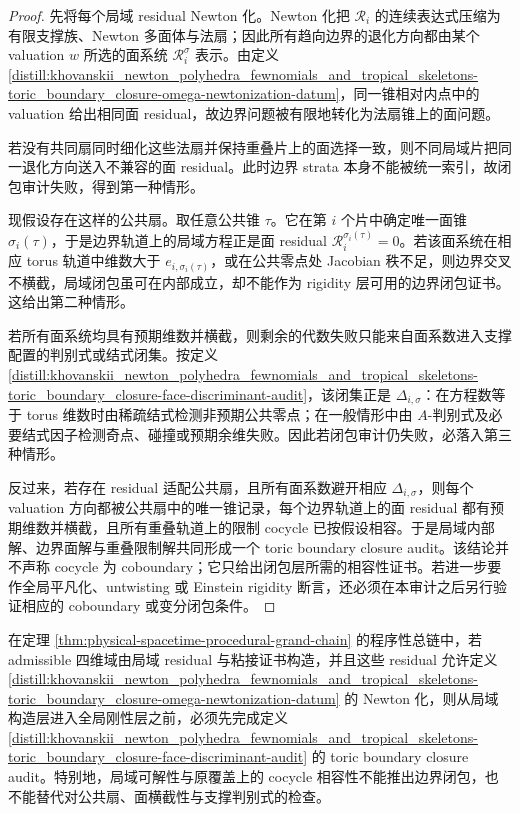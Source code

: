 \begin{proof}
先将每个局域 residual Newton 化。Newton 化把 \(\mathcal R_i\) 的连续表达式压缩为有限支撑族、Newton 多面体与法扇；因此所有趋向边界的退化方向都由某个 valuation \(w\) 所选的面系统 \(\mathcal R_i^{\sigma}\) 表示。由定义 \ref{distill:khovanskii_newton_polyhedra_fewnomials_and_tropical_skeletons-toric_boundary_closure-omega-newtonization-datum}，同一锥相对内点中的 valuation 给出相同面 residual，故边界问题被有限地转化为法扇锥上的面问题。

若没有共同扇同时细化这些法扇并保持重叠片上的面选择一致，则不同局域片把同一退化方向送入不兼容的面 residual。此时边界 strata 本身不能被统一索引，故闭包审计失败，得到第一种情形。

现假设存在这样的公共扇。取任意公共锥 \(\tau\)。它在第 \(i\) 个片中确定唯一面锥 \(\sigma_i(\tau)\)，于是边界轨道上的局域方程正是面 residual \(\mathcal R_i^{\sigma_i(\tau)}=0\)。若该面系统在相应 torus 轨道中维数大于 \(e_{i,\sigma_i(\tau)}\)，或在公共零点处 Jacobian 秩不足，则边界交叉不横截，局域闭包虽可在内部成立，却不能作为 rigidity 层可用的边界闭包证书。这给出第二种情形。

若所有面系统均具有预期维数并横截，则剩余的代数失败只能来自面系数进入支撑配置的判别式或结式闭集。按定义 \ref{distill:khovanskii_newton_polyhedra_fewnomials_and_tropical_skeletons-toric_boundary_closure-face-discriminant-audit}，该闭集正是 \(\Delta_{i,\sigma}\)：在方程数等于 torus 维数时由稀疏结式检测非预期公共零点；在一般情形中由 \(A\)-判别式及必要结式因子检测奇点、碰撞或预期余维失败。因此若闭包审计仍失败，必落入第三种情形。

反过来，若存在 residual 适配公共扇，且所有面系数避开相应 \(\Delta_{i,\sigma}\)，则每个 valuation 方向都被公共扇中的唯一锥记录，每个边界轨道上的面 residual 都有预期维数并横截，且所有重叠轨道上的限制 cocycle 已按假设相容。于是局域内部解、边界面解与重叠限制解共同形成一个 toric boundary closure audit。该结论并不声称 cocycle 为 coboundary；它只给出闭包层所需的相容性证书。若进一步要作全局平凡化、untwisting 或 Einstein rigidity 断言，还必须在本审计之后另行验证相应的 coboundary 或变分闭包条件。
\end{proof}
\begin{corollary}[总链中的闭包审计次序约束]\label{distill:khovanskii_newton_polyhedra_fewnomials_and_tropical_skeletons-toric_boundary_closure-grand-chain-audit-order}
在定理 \ref{thm:physical-spacetime-procedural-grand-chain} 的程序性总链中，若 admissible 四维域由局域 residual 与粘接证书构造，并且这些 residual 允许定义 \ref{distill:khovanskii_newton_polyhedra_fewnomials_and_tropical_skeletons-toric_boundary_closure-omega-newtonization-datum} 的 Newton 化，则从局域构造层进入全局刚性层之前，必须先完成定义 \ref{distill:khovanskii_newton_polyhedra_fewnomials_and_tropical_skeletons-toric_boundary_closure-face-discriminant-audit} 的 toric boundary closure audit。特别地，局域可解性与原覆盖上的 cocycle 相容性不能推出边界闭包，也不能替代对公共扇、面横截性与支撑判别式的检查。
\end{corollary}
